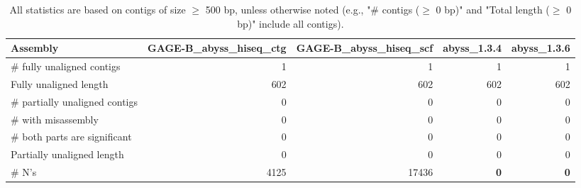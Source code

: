 \documentclass[12pt,a4paper]{article}
\begin{document}
\begin{table}[ht]
\begin{center}
\caption{All statistics are based on contigs of size $\geq$ 500 bp, unless otherwise noted (e.g., "\# contigs ($\geq$ 0 bp)" and "Total length ($\geq$ 0 bp)" include all contigs).}
\begin{tabular}{|l*{4}{|r}|}
\hline
Assembly & GAGE-B\_abyss\_hiseq\_ctg & GAGE-B\_abyss\_hiseq\_scf & abyss\_1.3.4 & abyss\_1.3.6 \\ \hline
\# fully unaligned contigs & 1 & 1 & 1 & 1 \\ \hline
Fully unaligned length & 602 & 602 & 602 & 602 \\ \hline
\# partially unaligned contigs & 0 & 0 & 0 & 0 \\ \hline
\hspace{5mm}\# with misassembly & 0 & 0 & 0 & 0 \\ \hline
\hspace{5mm}\# both parts are significant & 0 & 0 & 0 & 0 \\ \hline
Partially unaligned length & 0 & 0 & 0 & 0 \\ \hline
\# N's & 4125 & 17436 & {\bf 0} & {\bf 0} \\ \hline
\end{tabular}
\end{center}
\end{table}
\end{document}
